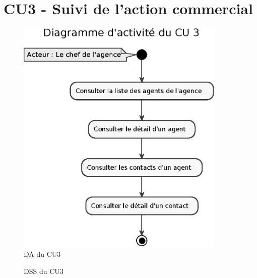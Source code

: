 \section{CU3 - Suivi de l’action commercial}
\vspace{2cm}
\begin{figure}[H]
\centering
\includegraphics[width=10cm]{figures/eps/DA_CU3.eps}
\caption{DA du CU3}
\end{figure}

\begin{figure}[H]
\noindent{}
\caption{DSS du CU3}
\end{figure}


